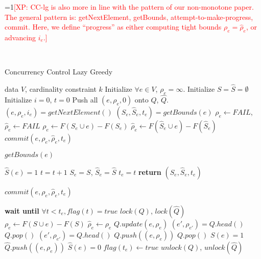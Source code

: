 \documentclass{article}
\newcommand{\Comments}{1}
\newcommand{\note}[2]{\ifnum\Comments=1\textcolor{#1}{#2}\fi}
\newcommand{\xinghao}[1]{\note{red}{[XP: #1]}}
\newcommand{\cclz}{CC-lg}
\begin{document}
\xinghao{\cclz{} is also more in line with the pattern of our non-monotone paper.
The general pattern is: getNextElement, getBounds, attempt-to-make-progress, commit.
Here, we define ``progress'' as either computing tight bounds $\rho_e = \widehat\rho_e$, or advancing $i_e$.}

~

\begin{algorithm}[tb]
  \caption{Concurrency Control Lazy Greedy}
  \label{alg:cclz}
\begin{algorithmic}[1]
   data $V$, cardinality constraint $k$
  \STATE Initialize $\forall e \in V$, $\rho_e = \infty$.
  \STATE Initialize $S = \widehat{S} = \emptyset$
  \STATE Initialize $i = 0$, $t = 0$
  \STATE Push all $(e, \rho_e, 0)$ onto $Q$, $\widehat{Q}$.
    \STATE $(e, \rho_e, i_e) = getNextElement()$
    \STATE $(S_e, \widehat{S}_e, t_e) = getBounds(e)$
      \STATE $\rho_e \leftarrow FAIL$, $\widehat\rho_e \leftarrow FAIL$
    \ELSE
      \STATE $\rho_e     \leftarrow F(S_e\cup e) - F(S_e)$
      \STATE $\widehat\rho_e \leftarrow F(\widehat{S}_e\cup e) - F(\widehat{S}_e)$
    \ENDIF
    \STATE $commit(e, \rho_e, \widehat\rho_e, t_e)$
  \ENDFOR
\end{algorithmic}
\end{algorithm}



\begin{algorithm}[tb]
  \caption{$getBounds(e)$}
  \label{alg:cclz:getbound}
\begin{algorithmic}
  \STATE $\widehat{S}(e) = 1$
  \STATE $t = t + 1$
  \STATE $S_e = S$, $\widehat{S}_e = \widehat{S}$
  \STATE $t_e = t$
  \STATE \textbf{return} $(S_e, \widehat{S}_e, t_e)$
\end{algorithmic}
\end{algorithm}


\begin{algorithm}[tb]
  \caption{$commit(e, \rho_e, \widehat\rho_e, t_e)$}
  \label{alg:cclz:commit}
\begin{algorithmic}
  \STATE \textbf{wait until} $\forall t < t_e, flag(t) = true$
  \STATE $lock(Q)$, $lock(\widehat{Q})$
    \STATE $\rho_e         \leftarrow F(S\cup e) - F(S)$
    \STATE $\widehat\rho_e \leftarrow \rho_e$
  \ENDIF
  \STATE $Q.update(e, \rho_e)$
  \STATE $(e', \rho_{e'}) = Q.head()$
    \STATE $Q.pop()$
    \STATE $(e', \rho_{e'}) = Q.head()$
    \STATE $Q.push((e, \rho_e))$
  \ENDIF
    \STATE $Q.pop()$
    \STATE $S(e) = 1$
  \ELSE
    \STATE $\widehat{Q}.push((e, \rho_e))$
    \STATE $\widehat{S}(e) = 0$
  \ENDIF
  \STATE $flag(t_e) \leftarrow true$
  \STATE $unlock(Q)$, $unlock(\widehat{Q})$
\end{algorithmic}
\end{algorithm}
\end{document}
